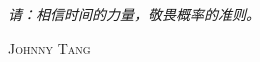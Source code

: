 
\vspace*{\fill}

\Large\textit{请：相信时间的力量，敬畏概率的准则。}

\bigskip

\begin{flushright}
    \sffamily\scshape Johnny Tang
\end{flushright}

\normalfont\normalsize

\vspace*{\fill}
